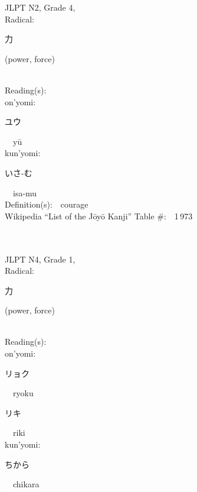 \begin{multicols}{2}
{JLPT N2, Grade 4, \\Radical:\ \ {\begin{CJK}{UTF8}{min} 力 \end{CJK}} (power, force) } \\
Reading(s):\ \ \\
{\hspace*{1em}}on'yomi:\ \ \\
{\hspace*{2em}}{\begin{CJK}{UTF8}{min} ユウ \end{CJK}}\ \ y\=u\ \ \\
{\hspace*{1em}}kun'yomi:\ \ \\
{\hspace*{2em}}{\begin{CJK}{UTF8}{min} いさ-む \end{CJK}}\ \ isa-mu\ \ \\
Definition(s):\ \ courage \\
Wikipedia ``List of the J\=oy\=o Kanji'' Table \#:\ \ 1\,973 \\
\ \ \\
{\fontsize{34pt}{40pt}  }\ \ \\  %
{JLPT N4, Grade 1, \\Radical:\ \ {\begin{CJK}{UTF8}{min} 力 \end{CJK}} (power, force) } \\
Reading(s):\ \ \\
{\hspace*{1em}}on'yomi:\ \ \\
{\hspace*{2em}}{\begin{CJK}{UTF8}{min} リョク \end{CJK}}\ \ ryoku\ \ \\
{\hspace*{2em}}{\begin{CJK}{UTF8}{min} リキ \end{CJK}}\ \ riki\ \ \\
{\hspace*{1em}}kun'yomi:\ \ \\
{\hspace*{2em}}{\begin{CJK}{UTF8}{min} ちから \end{CJK}}\ \ chikara\ \ \\

\end{multicols}

